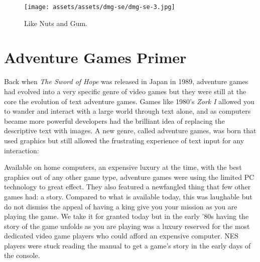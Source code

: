 \documentclass{book}
\begin{document}
\begin{figure}[hbt]
\vskip 10pt
\centering \texttt{[image: assets/assets/dmg-se/dmg-se-3.jpg]}\par\pagetwodescription Like Nuts and Gum.
\vskip 6pt
\end{figure}

\FloatBarrier\needspace{10mm}\section*{Adventure Games Primer}\nopagebreak[4]

Back when \emph{The Sword of Hope} was released in Japan in 1989, adventure games had evolved into a very specific genre of video games but they were still at the core the evolution of text adventure games. Games like 1980’s \emph{Zork I} allowed you to wander and interact with a large world through text alone, and as computers became more powerful developers had the brilliant idea of replacing the descriptive text with images. A new genre, called adventure games, was born that used graphics but still allowed the frustrating experience of text input for any interaction:


Available on home computers, an expensive luxury at the time, with the best graphics out of any other game type, adventure games were using the limited PC technology to great effect. They also featured a newfangled thing that few other games had: a story. Compared to what is available today, this was laughable but do not dismiss the appeal of having a king give you your mission as you are playing the game. We take it for granted today but in the early ’80s having the story of the game unfolds as you are playing was a luxury reserved for the most dedicated video game players who could afford an expensive computer. NES players were stuck reading the manual to get a game’s story in the early days of the console.
\end{document}
